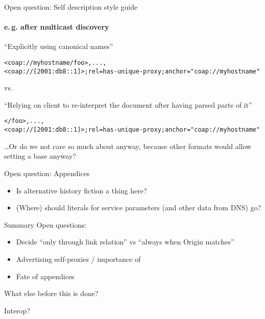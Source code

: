 \begin{frame}[fragile]{Open question: Self description style guide}\large
  \framesubtitle{e.\,g. after multicast discovery}

``Explicitly using canonical names''

\begin{verbatim}
<coap://myhostname/foo>,...,
<coap://[2001:db8::1]>;rel=has-unique-proxy;anchor="coap://myhostname"
\end{verbatim}

\begin{center}
vs.
\end{center}

``Relying on client to re-interpret the document after having parsed parts of it''

\begin{verbatim}
</foo>,...,
<coap://[2001:db8::1]>;rel=has-unique-proxy;anchor="coap://myhostname"
\end{verbatim}

  \bigskip

  \ldots Or do we not care so much about  anyway,
    because other formats would allow setting a base anyway?
\end{frame}

\begin{frame}{Open question: Appendices}\Large
  \begin{itemize}
    \item Is alternative history fiction a thing here?
    \item (Where) should literals for service parameters (and other data from DNS) go?
  \end{itemize}
\end{frame}

\begin{frame}{Summary}\Large
  Open questions:
  \begin{itemize}
    \item Decide ``only through link relation'' vs ``always when Origin matches''
    \item Advertising self-proxies / importance of 
    \item Fate of appendices
  \end{itemize}

  \bigskip
  
  What else before this is done?

  \bigskip

  Interop?
\end{frame}


